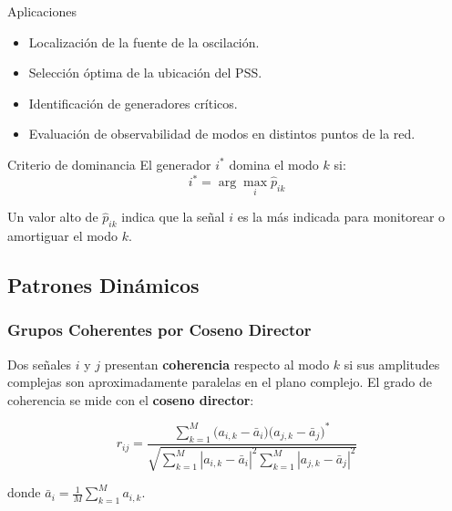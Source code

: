 \begin{block}{Aplicaciones}
\begin{itemize}
    \item Localización de la fuente de la oscilación.
    \item Selección óptima de la ubicación del PSS.
    \item Identificación de generadores críticos.
    \item Evaluación de observabilidad de modos en distintos puntos de la red.
\end{itemize}
\end{block}

\begin{exampleblock}{Criterio de dominancia}
    El generador $i^*$ domina el modo $k$ si:
    \begin{equation}
        i^* = \arg\max_i \hat{p}_{ik}
        \label{eq:dominancia_art}
    \end{equation}
    
    Un valor alto de $\hat{p}_{ik}$ indica que la señal $i$ es la más indicada
    para monitorear o amortiguar el modo $k$.
\end{exampleblock}


\subsection{Patrones Dinámicos}
\subsubsection{Grupos Coherentes por Coseno Director}

Dos señales $i$ y $j$ presentan \textbf{coherencia} respecto al modo $k$
si sus amplitudes complejas son aproximadamente paralelas en el plano complejo.
El grado de coherencia se mide con el \textbf{coseno director}:

\begin{equation}
    r_{ij} =
    \frac{\displaystyle\sum_{k=1}^{M}
          \bigl(a_{i,k} - \bar{a}_i\bigr)\bigl(a_{j,k} - \bar{a}_j\bigr)^*}
         {\sqrt{\displaystyle\sum_{k=1}^{M}|a_{i,k}-\bar{a}_i|^2
                \displaystyle\sum_{k=1}^{M}|a_{j,k}-\bar{a}_j|^2}}
    \label{eq:direction_cosine_art}
\end{equation}

donde $\bar{a}_i = \frac{1}{M}\sum_{k=1}^{M} a_{i,k}$.

